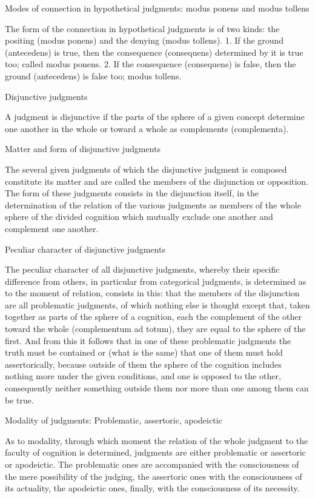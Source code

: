 Modes of connection in hypothetical judgments: modus ponens and modus tollens

The form of the connection in hypothetical judgments is of two kinds:
the positing (modus ponens) and the denying (modus tollens).
1. If the ground (antecedens) is true,
then the consequence (consequens) determined by it is true too;
called modus ponens.
2. If the consequence (consequens) is false,
then the ground (antecedens) is false too;
modus tollens.

Disjunctive judgments

A judgment is disjunctive if the parts of
the sphere of a given concept
determine one another in the whole
or toward a whole as complements (complementa).

Matter and form of disjunctive judgments

The several given judgments of which the disjunctive judgment
is composed constitute its matter
and are called the members of the disjunction or opposition.
The form of these judgments consists in the disjunction itself,
in the determination of the relation of the various judgments
as members of the whole sphere of the divided cognition
which mutually exclude one another and complement one another.

Peculiar character of disjunctive judgments

The peculiar character of all disjunctive judgments,
whereby their specific difference from others,
in particular from categorical judgments,
is determined as to the moment of relation,
consists in this:
that the members of the disjunction are all problematic judgments,
of which nothing else is thought except that,
taken together as parts of the sphere of a cognition,
each the complement of the other toward the whole
(complementum ad totum),
they are equal to the sphere of the first.
And from this it follows that
in one of these problematic judgments
the truth must be contained
or (what is the same)
that one of them must hold assertorically,
because outside of them the sphere of the cognition
includes nothing more under the given conditions,
and one is opposed to the other,
consequently neither something outside them
nor more than one among them can be true.

Modality of judgments: Problematic, assertoric, apodeictic

As to modality, through which moment the relation of
the whole judgment to the faculty of cognition is determined,
judgments are either problematic or assertoric or apodeictic.
The problematic ones are accompanied with
the consciousness of the mere possibility of the judging,
the assertoric ones with the consciousness of its actuality,
the apodeictic ones, finally, with the consciousness of its necessity.

